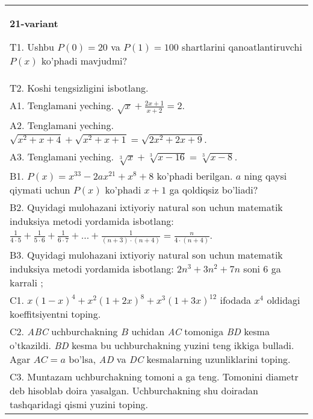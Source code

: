 \documentclass{article}
\begin{document}
\begin{tabular}{m{17cm}}
\textbf{21-variant}
\newline

T1. Ushbu \(P(0) = 20\) va \(P(1) = 100\) shartlarini qanoatlantiruvchi \(P(x)\) ko'phadi mavjudmi? \\
T2. Koshi tengsizligini isbotlang. \\
A1. Tenglamani yeching. \(\sqrt{x} + \frac{2x + 1}{x + 2} = 2\). \\
A2. Tenglamani yeching. \(\sqrt{x^{2} + x + 4} + \sqrt{x^{2} + x + 1} = \sqrt{2x^{2} + 2x + 9}\). \\
A3. Tenglamani yeching. \(\sqrt[3]{x} + \sqrt[3]{x - 16} = \sqrt[3]{x - 8}\). \\
B1. \(P(x) = x^{33} - 2ax^{21} + x^{8} + 8\) ko'phadi berilgan. \(a\) ning qaysi qiymati uchun \(P(x)\) ko'phadi \(x + 1\) ga qoldiqsiz bo'liadi? \\
B2. Quyidagi mulohazani ixtiyoriy natural son uchun matematik induksiya metodi yordamida isbotlang: \(\frac{1}{4 \cdot 5} + \frac{1}{5 \cdot 6} + \frac{1}{6 \cdot 7} + \ldots + \frac{1}{(n + 3) \cdot (n + 4)} = \frac{n}{4 \cdot (n + 4)}\). \\
B3. Quyidagi mulohazani ixtiyoriy natural son uchun matematik induksiya metodi yordamida isbotlang: \(2n^{3} + 3n^{2} + 7n\) soni 6 ga karrali ; \\
C1. \(x(1 - x)^{4} + x^{2}(1 + 2x)^{8} + x^{3}(1 + 3x)^{12}\) ifodada \(x^{4}\) oldidagi koeffitsiyentni toping. \\
C2. \emph{ABC} uchburchakning \(B\) uchidan \emph{AC} tomoniga \emph{BD} kesma o'tkazildi. \emph{BD} kesma bu uchburchakning yuzini teng ikkiga bulladi. Agar \(AC = a\) bo'lsa, \emph{AD} va \emph{DC} kesmalarning uzunliklarini toping. \\
C3. Muntazam uchburchakning tomoni a ga teng. Tomonini diametr deb hisoblab doira yasalgan. Uchburchakning shu doiradan tashqaridagi qismi yuzini toping. \\

\end{tabular}
\vspace{1cm}
\end{document}
